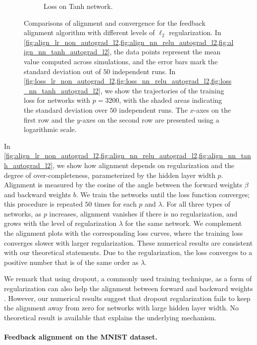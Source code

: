 \begin{figure}[ht]
\begin{subfigure}[b]{.33\textwidth}
  \caption{Loss on Tanh network.}
  \label{fig:loss_nn_tanh_autograd_l2}
\end{subfigure}
\caption{Comparisons of alignment and convergence for the feedback alignment algorithm with different levels of $\ell_2$ regularization. In \cref{fig:align_lr_non_autograd_l2,fig:align_nn_relu_autograd_l2,fig:align_nn_tanh_autograd_l2}, the data points represent the mean value computed across simulations, and the error bars mark the standard deviation out of $50$ independent runs. In \cref{fig:loss_lr_non_autograd_l2,fig:loss_nn_relu_autograd_l2,fig:loss_nn_tanh_autograd_l2}, we show the trajectories of the training loss for networks with $p = 3200$, with the shaded areas indicating the standard deviation over $50$ independent runs. The $x$-axes on the first row and the $y$-axes on the second row are presented using a logarithmic scale.}
\label{fig:synthetic-l2}
\end{figure}

In \cref{fig:align_lr_non_autograd_l2,fig:align_nn_relu_autograd_l2,fig:align_nn_tanh_autograd_l2}, we show how alignment depends on regularization and the degree of over-completeness, parameterized by the hidden layer width $p$. Alignment is measured by the cosine of the angle between the forward weights $\beta$ and backward weights $b$. We train the networks until the loss function converges; this procedure is repeated $50$ times for each $p$ and $\lambda$. For all three types of networks, as $p$ increases, alignment vanishes if there is no regularization, and grows with the level of regularization $\lambda$ for the same network. We complement the alignment plots with the corresponding loss curves, where the training loss converges slower with larger regularization. These numerical results are consistent with our theoretical statements. Due to the regularization, the loss converges to a positive number that is of the same order as $\lambda$.

We remark that using dropout, a commonly used training technique, as a form of regularization can also help the alignment between forward and backward weights \citep{wager2013dropout}. However, our numerical results suggest that dropout regularization fails to keep the alignment away from zero for networks with large hidden layer width. No theoretical result is available that explains the underlying mechanism.


\paragraph{Feedback alignment on the MNIST dataset.}

